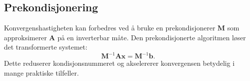 \subsection{Prekondisjonering}
Konvergenshastigheten kan forbedres ved å bruke en prekondisjonerer \(\symbf{M}\) som approksimerer \(\symbf{A}\) på en inverterbar måte. Den prekondisjonerte algoritmen løser det transformerte systemet:
\[
  \symbf{M}^{-1}\symbf{A}\symbf{x} = \symbf{M}^{-1}\symbf{b}.
\]
Dette reduserer kondisjonsnummeret og akselererer konvergensen betydelig i mange praktiske tilfeller.
